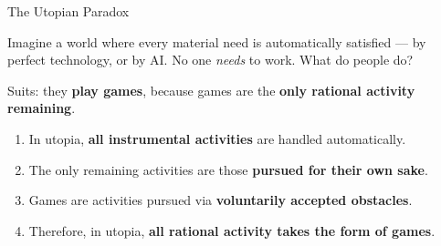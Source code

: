 \documentclass[aspectratio=169,11pt]{beamer}
\begin{document}
\begin{frame}[t]{The Utopian Paradox}
\begin{conceptbox}
\footnotesize
Imagine a world where every material need is automatically satisfied --- by perfect technology, or by AI. No one \emph{needs} to work. What do people do?

\vspace{0.05cm}
Suits: they \textbf{play games}, because games are the \textbf{only rational activity remaining}.
\end{conceptbox}

\vspace{0.12cm}
\begin{argumentbox}
\footnotesize
\begin{enumerate}
    \item In utopia, \textbf{all instrumental activities} are handled automatically.
    \item The only remaining activities are those \textbf{pursued for their own sake}.
    \item Games are activities pursued via \textbf{voluntarily accepted obstacles}.
    \item Therefore, in utopia, \textbf{all rational activity takes the form of games}.
\end{enumerate}
\end{argumentbox}
\end{frame}
\end{document}
